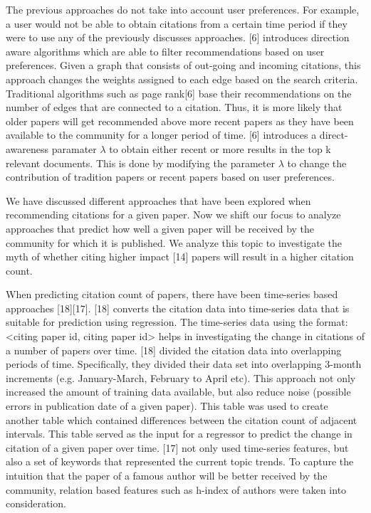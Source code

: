 \documentclass[journal]{IEEEtran}
\begin{document}
The previous approaches do not take into account user preferences.  For example, a user would not be able to obtain citations from a certain time period if they were to use any of the previously discusses approaches.  [6] introduces direction aware algorithms which are able to filter recommendations based on user preferences. 
Given a graph that consists of out-going and incoming citations, this approach changes the weights assigned to each edge based on the search criteria.  Traditional algorithms such as page rank[6] base their recommendations on the number of edges that are connected to a citation.  Thus, it is more likely that older papers will get recommended above more recent papers as they have been available to the community for a longer period of time. [6] introduces a direct-awareness paramater $\lambda$ to obtain either recent or more results in the top k relevant documents.   This is done by modifying the parameter $\lambda$ to change the contribution of tradition papers or recent papers based on user preferences.

We have discussed different approaches that have been explored when recommending citations for a given paper.  Now we shift our focus to analyze approaches that predict how well a given paper will be received by the community for which it is published.  We analyze this topic to investigate the myth of whether citing higher impact [14] papers will result in a higher citation count.  

When predicting citation count of papers, there have been time-series based approaches [18][17].  [18] converts the citation data into time-series data that is suitable for prediction using regression.  The time-series data using the format: <citing paper id, citing paper id>  helps in investigating the change in citations of a number of papers over time.  [18] divided the  citation data into overlapping periods of time.  Specifically, they divided their data set into overlapping 3-month increments (e.g. January-March, February to April etc).   This approach not only increased the amount of training data available, but also reduce noise (possible errors in publication date of a given paper).  This table was used to create another table which contained differences between the citation count of adjacent intervals. This table served as the input for a regressor to predict the change in citation of a given paper over time.  [17] not only used time-series features, but also a set of keywords that represented the current topic trends.  To capture the intuition that the paper of a famous author will be better received by the community, relation based features such as h-index of authors were taken into consideration.
\end{document}
